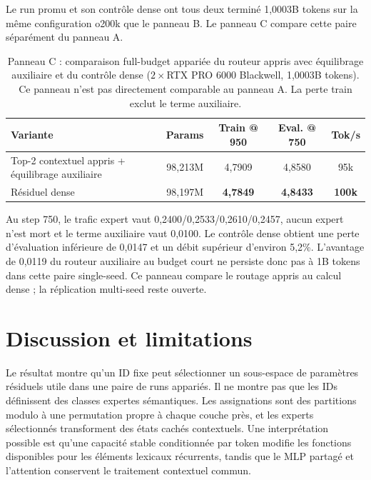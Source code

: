 \documentclass[10pt]{article}
\theoremstyle{definition}
\theoremstyle{remark}
\begin{document}
Le run promu et son contr\^{o}le dense ont tous deux termin\'{e} 1,0003B tokens sur la m\^{e}me configuration o200k que le panneau B. Le panneau C compare cette paire s\'{e}par\'{e}ment du panneau A.

\begin{table}[H]
\centering
\small
\caption{Panneau C : comparaison full-budget appari\'{e}e du routeur appris avec \'{e}quilibrage auxiliaire et du contr\^{o}le dense ($2\times$RTX PRO 6000 Blackwell, 1,0003B tokens). Ce panneau n'est pas directement comparable au panneau A. La perte train exclut le terme auxiliaire.}
\label{tab:1b_router_promotion}
\begin{tabular}{lcccc}
\toprule
\textbf{Variante} & \textbf{Params} & \textbf{Train @ 950} & \textbf{Eval. @ 750} & \textbf{Tok/s} \\
\midrule
Top-2 contextuel appris + \'{e}quilibrage auxiliaire & 98,213M & 4,7909 & 4,8580 & 95k \\
R\'{e}siduel dense & 98,197M & \textbf{4,7849} & \textbf{4,8433} & \textbf{100k} \\
\bottomrule
\end{tabular}
\end{table}

Au step 750, le trafic expert vaut 0,2400/0,2533/0,2610/0,2457, aucun expert n'est mort et le terme auxiliaire vaut 0,0100. Le contr\^{o}le dense obtient une perte d'\'{e}valuation inf\'{e}rieure de 0,0147 et un d\'{e}bit sup\'{e}rieur d'environ 5,2\%. L'avantage de 0,0119 du routeur auxiliaire au budget court ne persiste donc pas \`{a} 1B tokens dans cette paire single-seed. Ce panneau compare le routage appris au calcul dense ; la r\'{e}plication multi-seed reste ouverte.
\FloatBarrier

\section{Discussion et limitations}
\label{sec:discussion}
\label{sec:limitations}

Le r\'{e}sultat montre qu'un ID fixe peut s\'{e}lectionner un sous-espace de param\`{e}tres r\'{e}siduels utile dans une paire de runs appari\'{e}s. Il ne montre pas que les IDs d\'{e}finissent des classes expertes s\'{e}mantiques. Les assignations sont des partitions modulo \`{a} une permutation propre \`{a} chaque couche pr\`{e}s, et les experts s\'{e}lectionn\'{e}s transforment des \'{e}tats cach\'{e}s contextuels. Une interpr\'{e}tation possible est qu'une capacit\'{e} stable conditionn\'{e}e par token modifie les fonctions disponibles pour les \'{e}l\'{e}ments lexicaux r\'{e}currents, tandis que le MLP partag\'{e} et l'attention conservent le traitement contextuel commun.
\end{document}
